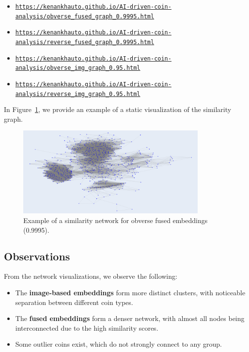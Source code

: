 \documentclass[nolibertine, english, algorithm, nomencl, minted]{ttlab-qualify}
\begin{document}
\begin{itemize}
    \scriptsize
    \item \href{https://kenankhauto.github.io/AI-driven-coin-analysis/obverse_fused_graph_0.9995.html}{\texttt{https://kenankhauto.github.io/AI-driven-coin-analysis/obverse\_fused\_graph\_0.9995.html}}
    \item \href{https://kenankhauto.github.io/AI-driven-coin-analysis/reverse_fused_graph_0.9995.html}{\texttt{https://kenankhauto.github.io/AI-driven-coin-analysis/reverse\_fused\_graph\_0.9995.html}}
    \item \href{https://kenankhauto.github.io/AI-driven-coin-analysis/obverse_img_graph_0.95.html}{\texttt{https://kenankhauto.github.io/AI-driven-coin-analysis/obverse\_img\_graph\_0.95.html}}
    \item \href{https://kenankhauto.github.io/AI-driven-coin-analysis/reverse_img_graph_0.95.html}{\texttt{https://kenankhauto.github.io/AI-driven-coin-analysis/reverse\_img\_graph\_0.95.html}}
\end{itemize}

In Figure~\ref{fig:network_image}, we provide an example of a static visualization of the similarity graph.

\begin{figure}[H]
    \centering
    \includegraphics[width=0.85\textwidth]{static/obverse_fused_graph.png}
    \caption{Example of a similarity network for obverse fused embeddings (0.9995).}
    \label{fig:network_image}
\end{figure}

\subsection{Observations}
From the network visualizations, we observe the following:
\begin{itemize}
    \item The \textbf{image-based embeddings} form more distinct clusters, with noticeable separation between different coin types.
    \item The \textbf{fused embeddings} form a denser network, with almost all nodes being interconnected due to 
    the high similarity scores.
    \item Some outlier coins exist, which do not strongly connect to any group.
\end{itemize}
\end{document}
